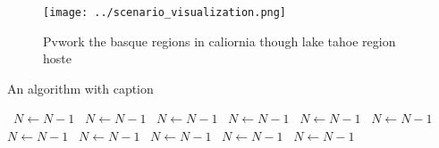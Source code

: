 \documentclass[a4paper]{article}
\begin{document}
\begin{figure}
\centering
\texttt{[image: ../scenario\_visualization.png]}
\caption{Pvwork the basque regions in caliornia though lake tahoe region hoste
}
\end{figure}
 
\begin{algorithm}
\caption{An algorithm with caption}
\begin{algorithmic}
\    \State $N \gets N - 1$
\    \State $N \gets N - 1$
\    \State $N \gets N - 1$
\    \State $N \gets N - 1$
\    \State $N \gets N - 1$
\    \State $N \gets N - 1$
\    \State $N \gets N - 1$
\    \State $N \gets N - 1$
\    \State $N \gets N - 1$
\    \State $N \gets N - 1$
\    \State $N \gets N - 1$
\EndWhile
\end{algorithmic}
\end{algorithm}
\end{document}
